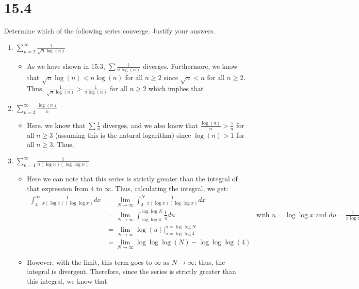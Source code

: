 \documentclass[10pt,a4paper]{article}
\theoremstyle{definition}
\begin{document}
\section*{15.4}
Determine which of the following series converge. Justify your answers.
\begin{enumerate}[label = (\alph*)]
\item $\displaystyle \sum_{n = 2}^{\infty} \frac{1}{\sqrt{n}\log(n)}$
	\begin{itemize}
	\item As we have shown in 15.3, $\sum \frac{1}{n\log(n)}$ diverges. Furthermore, we know that $\sqrt{n}\log(n) < n\log(n)$ for all $n \geq 2$ since $\sqrt{n} < n$ for all $n \geq 2$. Thus, $\frac{1}{\sqrt{n}\log(n)} > \frac{1}{n\log(n)}$ for all $n \geq 2$ which implies that \\
	\end{itemize}
\item $\displaystyle \sum_{n = 2}^{\infty} \frac{\log(n)}{n}$
	\begin{itemize}
	\item Here, we know that $\sum \frac{1}{n}$ diverges, and we also know that $\frac{\log(n)}{n} > \frac{1}{n}$ for all $n \geq 3$ (assuming this is the natural logarithm) since $\log(n) > 1$ for all $n \geq 3$. Thus, 
	\end{itemize}
\item $\displaystyle \sum_{n = 4}^{\infty} \frac{1}{n(\log n)(\log \log n)}$
	\begin{itemize}
	\item Here we can note that this series is strictly greater than the integral of that expression from 4 to $\infty$. Thus, calculating the integral, we get:
	\begin{align*}
	\int_4^{\infty} \frac{1}{x(\log x)(\log \log x)}dx &= \lim_{N \to \infty} \int_4^N \frac{1}{x(\log x)(\log \log x)}dx\\
	&= \lim_{N \to \infty} \int_{\log \log 4}^{\log \log N} \frac{1}{u}du &\text{with $u = \log \log x$ and $du = \frac{1}{x\log x}dx$}\\
	&= \lim_{N \to \infty} \log(u) \bigg|_{u = \log \log 4}^{u = \log \log N}\\
	&= \lim_{N \to \infty} \log \log \log(N) - \log \log \log (4)
	\end{align*}
	\item However, with the limit, this term goes to $\infty$ as $N \to \infty$; thus, the integral is divergent. Therefore, since the series is strictly greater than this integral, we know that 

\end{itemize}
\end{enumerate}
\end{document}

